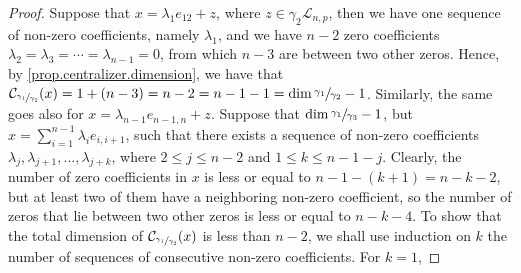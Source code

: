 \documentclass[12pt]{article}
\begin{document}
\begin{proof}
Suppose that $x=\lambda_1 e_{12}+z$, where $z\in\gamma_2 \mathcal{L}_{n,p}$, then we have one sequence of non-zero coefficients, namely $\lambda_1$, and we have $n-2$ zero coefficients $\lambda_2=\lambda_3=\cdots=\lambda_{n-1}=0$, from which $n-3$ are between two other zeros. Hence, by \ref{prop.centralizer.dimension}, we have that $\mathcal{C}_{\sfrac{\gamma_1}{\gamma_2}}(x)=1+(n-3)=n-2=n-1-1=\dim\sfrac{\gamma_1}{\gamma_2}-1$. Similarly, the same goes also for $x=\lambda_{n-1}e_{n-1,n}+z$.
Suppose that $\dim\sfrac{\gamma_1}{\gamma_3}-1$, but $x=\sum_{i=1}^{n-1}\lambda_i e_{i,i+1}$, such that there exists a sequence of non-zero coefficients $\lambda_j,\lambda_{j+1},\dots,\lambda_{j+k}$, where $2\leq j\leq n-2$ and $1\leq k\leq n-1-j$. Clearly, the number of zero coefficients in $x$ is less or equal to $n-1-(k+1)=n-k-2$, but at least two of them have a neighboring non-zero coefficient, so the number of zeros that lie between two other zeros is less or equal to $n-k-4$. To show that the total dimension of $\mathcal{C}_{\sfrac{\gamma_1}{\gamma_2}}(x)$ is less than $n-2$, we shall use induction on $k$ the number of sequences of consecutive non-zero coefficients. For $k=1$,  
\end{proof}
\end{document}
